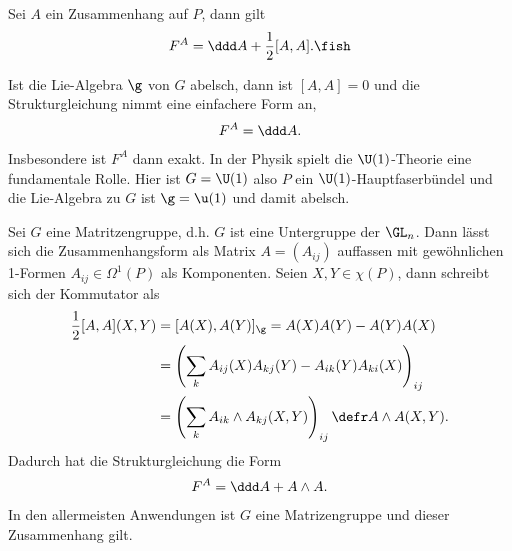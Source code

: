 \documentclass[%
	paper=a5,%
	fleqn,%
	DIV=18,%
	BCOR=0mm,
	fontsize=11pt,
	titlepage=false,%
	bibliography=totoc,
	DIV=18,%
	twoside=true,
	pdftitle=Riemannsche Geometrie,
	pdfauthor=Uwe Semmelmann,
	numbers=noendperiod]%
	{scrbook}
\begin{document}
\begin{prop}[Strukturgleichung]
Sei $A$ ein Zusammenhang auf $P$, dann gilt
\begin{align*}
F^A = \ddd A + \frac{1}{2}[A,A].\fish
\end{align*}
\end{prop}

\begin{rem}[Bemerkungen.]
\begin{remenum}
\item Ist die Lie-Algebra $\g$ von $G$ abelsch, dann ist $[A,A] = 0$ und die
Strukturgleichung nimmt eine einfachere Form an,
\begin{align*}
F^A = \ddd A.
\end{align*}
Insbesondere ist $F^A$ dann exakt. In der Physik spielt die $\U(1)$-Theorie eine
fundamentale Rolle. Hier ist $G=\U(1)$ also $P$ ein $\U(1)$-Hauptfaserbündel
und die Lie-Algebra zu $G$ ist $\g = \u(1)$ und damit abelsch.
\item Sei $G$ eine Matritzengruppe, d.h. $G$ ist eine Untergruppe der $\GL_n$.
Dann lässt sich die Zusammenhangsform als Matrix $A=(A_{ij})$ auffassen mit
gewöhnlichen 1-Formen $A_{ij}\in\Omega^1(P)$ als Komponenten. Seien
$X,Y\in\chi(P)$, dann schreibt sich der Kommutator als
\begin{align*}
\frac{1}{2}[A,A](X,Y) &= 
[A(X),A(Y)]_\g = A(X)A(Y)-A(Y)A(X)\\
&= \left( \sum_k A_{ij}(X)A_{kj}(Y) - A_{ik}(Y)A_{ki}(X) \right)_{ij}\\
&= \left( \sum_k A_{ik}\wedge A_{kj}(X,Y) \right)_{ij} \defr A\wedge A(X,Y).
\end{align*}
Dadurch hat die Strukturgleichung die Form
\begin{align*}
F^A = \ddd A + A\wedge A.
\end{align*}
In den allermeisten Anwendungen ist $G$ eine Matrizengruppe und dieser
Zusammenhang gilt.\map
\end{remenum}
\end{rem}
\end{document}
